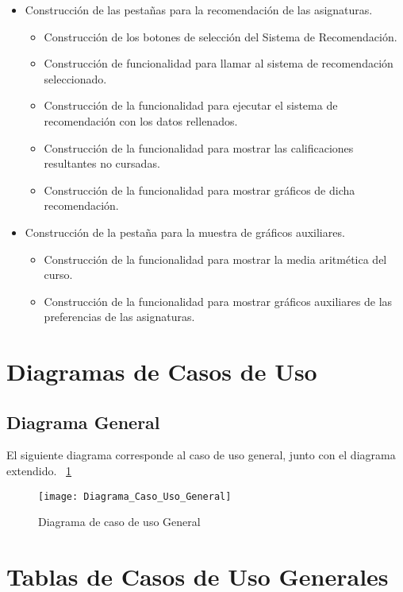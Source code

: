 \begin{itemize}
\item Construcción de las pestañas para la recomendación de las asignaturas. 
\begin{itemize}
\item Construcción de los botones  de selección del Sistema de Recomendación.
\item Construcción de funcionalidad para llamar al sistema de recomendación  seleccionado. 
\item Construcción de la funcionalidad para ejecutar el sistema de recomendación con los datos rellenados. 
\item Construcción de la funcionalidad para mostrar las calificaciones resultantes no cursadas. 
\item Construcción de la funcionalidad para mostrar gráficos de dicha recomendación. 
\end{itemize}

\item Construcción de la pestaña para la muestra de gráficos auxiliares. 
\begin{itemize}
\item Construcción de la funcionalidad para mostrar la media aritmética del curso. 
\item Construcción de la funcionalidad para mostrar gráficos auxiliares de las preferencias de las asignaturas. 
\end{itemize}

\end{itemize}

\section{Diagramas de Casos de Uso}
\subsection{Diagrama General}
El siguiente diagrama corresponde al  caso de uso general, junto con el diagrama extendido. ~\ref{fig:Diagrama_Caso_Uso_General}
\begin{figure}[h]
\centering
\texttt{[image: Diagrama\_Caso\_Uso\_General]}
\caption{Diagrama de caso de uso General}
\label{fig:Diagrama_Caso_Uso_General}
\end{figure}

\section{Tablas de Casos de Uso Generales}
